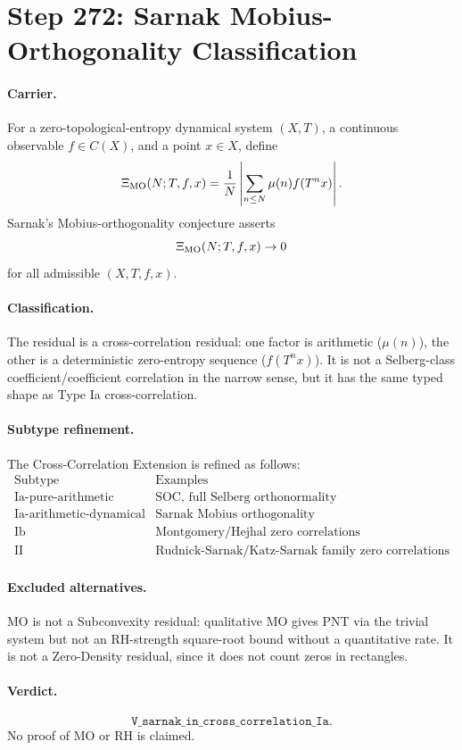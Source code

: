 \section*{Step 272: Sarnak Mobius-Orthogonality Classification}

\paragraph{Carrier.}
For a zero-topological-entropy dynamical system $(X,T)$, a continuous
observable $f\in C(X)$, and a point $x\in X$, define
\[
  \Xi_{\rm MO}(N;T,f,x)=\frac{1}{N}
  \left|\sum_{n\leq N}\mu(n)f(T^n x)\right|.
\]
Sarnak's Mobius-orthogonality conjecture asserts
\[
  \Xi_{\rm MO}(N;T,f,x)\to 0
\]
for all admissible $(X,T,f,x)$.

\paragraph{Classification.}
The residual is a cross-correlation residual: one factor is arithmetic
($\mu(n)$), the other is a deterministic zero-entropy sequence
($f(T^n x)$).  It is not a Selberg-class coefficient/coefficient correlation
in the narrow sense, but it has the same typed shape as Type Ia
cross-correlation.

\paragraph{Subtype refinement.}
The Cross-Correlation Extension is refined as follows:
\[
\begin{array}{c|l}
\text{Subtype} & \text{Examples}\\\hline
\text{Ia-pure-arithmetic} & \text{SOC, full Selberg orthonormality}\\
\text{Ia-arithmetic-dynamical} & \text{Sarnak Mobius orthogonality}\\
\text{Ib} & \text{Montgomery/Hejhal zero correlations}\\
\text{II} & \text{Rudnick-Sarnak/Katz-Sarnak family zero correlations}
\end{array}
\]

\paragraph{Excluded alternatives.}
MO is not a Subconvexity residual: qualitative MO gives PNT via the trivial
system but not an RH-strength square-root bound without a quantitative rate.
It is not a Zero-Density residual, since it does not count zeros in
rectangles.

\paragraph{Verdict.}
\[
  \boxed{\texttt{V\_sarnak\_in\_cross\_correlation\_Ia}}.
\]
No proof of MO or RH is claimed.
